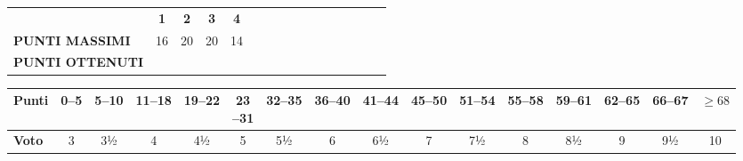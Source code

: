 \documentclass[a4paper,11pt,twoside]{article}
\begin{document}
\vspace{0.6cm}

\noindent
\scriptsize %
\begin{tabular}{|l|*{15}{c|}}
\hline
& \textbf{1} & \textbf{2} & \textbf{3} & \textbf{4} & \textbf{ } & \textbf{ } &  \\
\textbf{PUNTI MASSIMI} & 16 & 20 & 20 & 14 &  &  &  \\
\hline
\textbf{PUNTI OTTENUTI} & & & & & & & \\
\hline
\end{tabular}

\vspace{0.9cm}

\noindent
\begin{tabular}{|l|*{15}{c|}}
\hline
\textbf{Punti} &
0--5 & 5--10 & 11--18 & 19--22 & \makecell{23\\[-3pt]--31} &
32--35 & 36--40 & 41--44 & 45--50 & 51--54 &
55--58 & 59--61 & 62--65 & 66--67 & $\ge 68$  \\
\hline
\multicolumn{1}{|l|}{\textbf{Voto}} &
3 & 3½ & 4 & 4½ & 5 &
5½ & 6 & 6½ & 7 & 7½ &
8 & 8½ & 9 & 9½ & 10 \\
\hline
\end{tabular}
\end{document}
